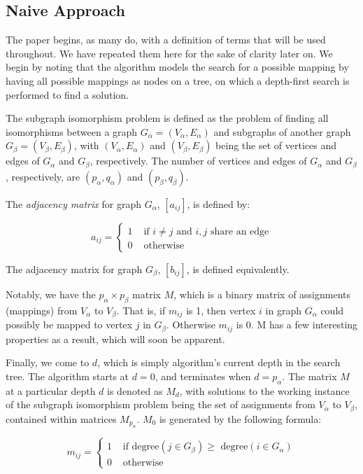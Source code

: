 \documentclass{article}
\begin{document}
  \subsection{Naive Approach}

  The paper begins, as many do, with a definition of terms that will be used throughout. We have repeated them here for the sake of clarity later on. We begin by noting that the algorithm models the search for a possible mapping by having all possible mappings as nodes on a tree, on which a depth-first search is performed to find a solution.

  The subgraph isomorphism problem is defined as the problem of finding all isomorphisms between a graph $G_\alpha = (V_\alpha, E_\alpha)$ and subgraphs of another graph $G_\beta = (V_\beta, E_\beta)$, with $(V_\alpha, E_\alpha)$ and $(V_\beta, E_\beta)$ being the set of vertices and edges of $G_\alpha$ and $G_\beta$, respectively. The number of vertices and edges of $G_\alpha$ and $G_\beta$, respectively, are $(p_\alpha, q_\alpha)$ and $(p_\beta, q_\beta)$.

  The \textit{adjacency matrix} for graph $G_\alpha$, $[a_{ij}]$, is defined by:

  \[ a_{ij} = \begin{cases}
                1 & \textrm{ if } i \neq j \textrm{ and } i,j \textrm{ share an edge} \\
                0 & \textrm{ otherwise}
  \end{cases}
  \]

  The adjacency matrix for graph $G_\beta$, $[b_{ij}]$, is defined equivalently.

  Notably, we have the $p_\alpha \times p_\beta$ matrix $M$, which is a binary matrix of assignments (mappings) from $V_\alpha$ to $V_\beta$. That is, if $m_{ij}$ is 1, then vertex $i$ in graph $G_\alpha$ could possibly be mapped to vertex $j$ in $G_\beta$. Otherwise $m_{ij}$ is 0. M has a few interesting properties as a result, which will soon be apparent.

  Finally, we come to $d$, which is simply algorithm's current depth in the search tree. The algorithm starts at $d = 0$, and terminates when $d = p_\alpha$. The matrix $M$ at a particular depth $d$ is denoted as $M_d$, with solutions to the working instance of the subgraph isomorphism problem being the set of assignments from $V_\alpha$ to $V_\beta$, contained within matrices $M_{p_\alpha}$. $M_0$ is generated by the following formula:

  \[ m_{ij} = \begin{cases}
    1 & \textrm{ if degree} (j \in G_\beta) \geq \textrm{ degree} (i \in G_\alpha) \\
                0 & \textrm{ otherwise}
  \end{cases}
  \]
\end{document}
